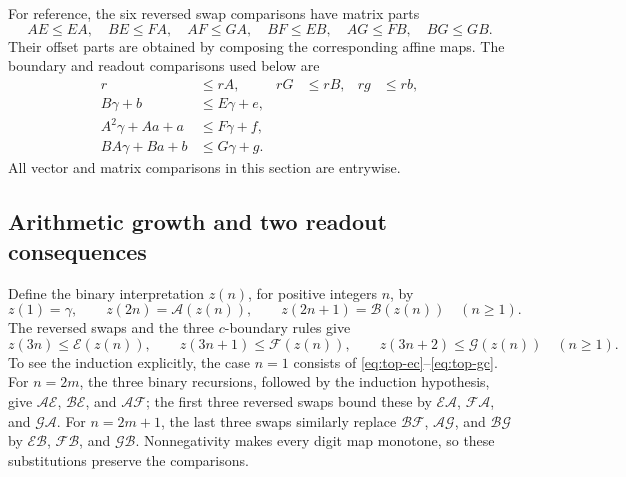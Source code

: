 \documentclass[11pt,a4paper]{article}
\begin{document}
For reference, the six reversed swap comparisons have matrix parts
\begin{equation}\label{eq:top-swaps}
AE\le EA,\quad BE\le FA,\quad AF\le GA,\quad
BF\le EB,\quad AG\le FB,\quad BG\le GB.
\end{equation}
Their offset parts are obtained by composing the corresponding
affine maps. The boundary and readout comparisons used below are
\begin{align}
r&\le rA,& rG&\le rB,& rg&\le rb,\label{eq:top-readout}\\
B\gamma+b&\le E\gamma+e,\label{eq:top-ec}\\
A^2\gamma+Aa+a&\le F\gamma+f,\label{eq:top-fc}\\
BA\gamma+Ba+b&\le G\gamma+g.\label{eq:top-gc}
\end{align}
All vector and matrix comparisons in this section are entrywise.

\subsection{Arithmetic growth and two readout consequences}

Define the binary interpretation $z(n)$, for positive integers $n$, by
\[
z(1)=\gamma,\qquad z(2n)=\mathcal A(z(n)),\qquad
z(2n+1)=\mathcal B(z(n))\quad(n\ge1).
\]
The reversed swaps and the three $c$-boundary rules give
\begin{equation}\label{eq:top-conversion}
z(3n)\le\mathcal E(z(n)),\qquad
z(3n+1)\le\mathcal F(z(n)),\qquad
z(3n+2)\le\mathcal G(z(n))\quad(n\ge1).
\end{equation}
To see the induction explicitly, the case $n=1$ consists of
\eqref{eq:top-ec}--\eqref{eq:top-gc}. For $n=2m$, the three
binary recursions, followed by the induction hypothesis, give
$\mathcal A\mathcal E$, $\mathcal B\mathcal E$,
and $\mathcal A\mathcal F$; the first three reversed swaps bound
these by $\mathcal E\mathcal A$, $\mathcal F\mathcal A$,
and $\mathcal G\mathcal A$. For $n=2m+1$, the last three swaps
similarly replace $\mathcal B\mathcal F$, $\mathcal A\mathcal G$,
and $\mathcal B\mathcal G$ by
$\mathcal E\mathcal B$, $\mathcal F\mathcal B$,
and $\mathcal G\mathcal B$. Nonnegativity makes every digit map
monotone, so these substitutions preserve the comparisons.
\end{document}
